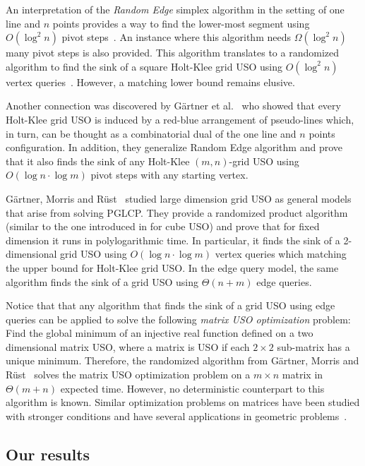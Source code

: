 \documentclass[runningheads,a4paper]{llncs}
\begin{document}
An interpretation of the \emph{Random Edge} simplex algorithm in the setting of one line and $n$ points provides a way to find the lower-most segment using $O(\log^2 n )$ pivot steps~\cite{linepoint}. 
An instance where this algorithm needs $\Omega(\log^2 n )$ many pivot steps is also provided. 
This algorithm translates to a randomized algorithm to find the sink of a square Holt-Klee grid USO using $O(\log^2 n)$ vertex queries~\cite{falkthesis}. However, a matching lower bound remains elusive.

Another connection was discovered by G\"artner et al.~\cite{grid05} who showed that every Holt-Klee grid USO is induced by a red-blue arrangement of pseudo-lines which, in turn, can be thought as a combinatorial dual of the one line and $n$ points configuration.
In addition, they generalize Random Edge algorithm and prove that it also finds the sink of any Holt-Klee $(m,n)$-grid USO using $O(\log n\cdot\log m)$ pivot steps with any starting vertex. 

G\"artner, Morris and R\"ust~\cite{grid08} studied large dimension grid USO as general models that arise from solving PGLCP. They provide a randomized product algorithm (similar to the one introduced in \cite{SW} for cube USO) and prove that for fixed dimension it runs in polylogarithmic time. 
In particular, it finds the sink of a 2-dimensional grid USO using $O(\log n \cdot \log m)$ vertex queries which matching the upper bound for Holt-Klee grid USO. In the edge query model, the same algorithm finds the sink of a grid USO using $\Theta(n + m)$ edge queries.

Notice that that any algorithm that finds the sink of a grid USO using edge queries can be applied to solve the following \emph{matrix USO optimization} problem: Find the global minimum of an injective real function defined on a two dimensional matrix USO, where a matrix is USO if each $2\times 2$ sub-matrix has a unique minimum. 
Therefore, the randomized algorithm from G\"artner, Morris and R\"ust~\cite{grid08} solves the matrix USO optimization problem on a $m\times n$ matrix in $\Theta(m+n)$ expected time. However, no deterministic counterpart to this algorithm is known. 
Similar optimization problems on matrices have been studied with stronger conditions and have several applications in geometric problems~\cite{aggarwal1987geometric,demaine2005optimizing,galil1992dynamic,mityagin2003complexity}.

\subsection{Our results}
\end{document}
